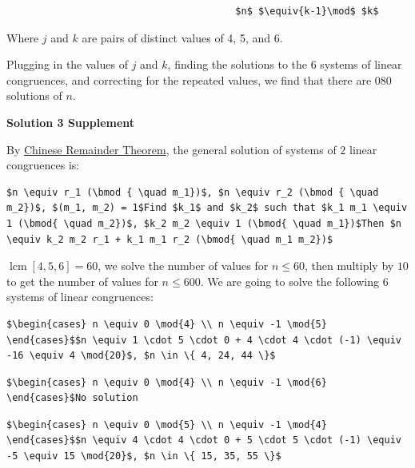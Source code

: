 \begin{enumerate}
\begin{verbatim}
										$n$ $\equiv{k-1}\mod$ $k$
\end{verbatim}

Where $j$ and $k$ are pairs of distinct values of 4, 5, and 6.

 Plugging in the values of $j$ and $k$, finding the solutions to the 6 systems of linear congruences, and correcting for the repeated values, we find that there are $\boxed{080}$ solutions of $n$.

 



\textbf{Solution 3 Supplement}

By \href{https://artofproblemsolving.com/wiki/index.php/Chinese\_Remainder\_Theorem}{Chinese Remainder Theorem}, the general solution of systems of $2$ linear congruences is:

 \begin{verbatim}
$n \equiv r_1 (\bmod { \quad m_1})$, $n \equiv r_2 (\bmod { \quad m_2})$, $(m_1, m_2) = 1$Find $k_1$ and $k_2$ such that $k_1 m_1 \equiv 1 (\bmod{ \quad m_2})$, $k_2 m_2 \equiv 1 (\bmod{ \quad m_1})$Then $n \equiv k_2 m_2 r_1 + k_1 m_1 r_2 (\bmod{ \quad m_1 m_2})$
\end{verbatim}

$\operatorname{lcm}[4, 5, 6] = 60$, we solve the number of values for $n \le 60$, then multiply by $10$ to get the number of values for $n \le 600$. We are going to solve the following $6$ systems of linear congruences:

 \begin{verbatim}
$\begin{cases} n \equiv 0 \mod{4} \\ n \equiv -1 \mod{5} \end{cases}$$n \equiv 1 \cdot 5 \cdot 0 + 4 \cdot 4 \cdot (-1) \equiv -16 \equiv 4 \mod{20}$, $n \in \{ 4, 24, 44 \}$
\end{verbatim}

\begin{verbatim}
$\begin{cases} n \equiv 0 \mod{4} \\ n \equiv -1 \mod{6} \end{cases}$No solution
\end{verbatim}

\begin{verbatim}
$\begin{cases} n \equiv 0 \mod{5} \\ n \equiv -1 \mod{4} \end{cases}$$n \equiv 4 \cdot 4 \cdot 0 + 5 \cdot 5 \cdot (-1) \equiv -5 \equiv 15 \mod{20}$, $n \in \{ 15, 35, 55 \}$
\end{verbatim}


\end{enumerate}
